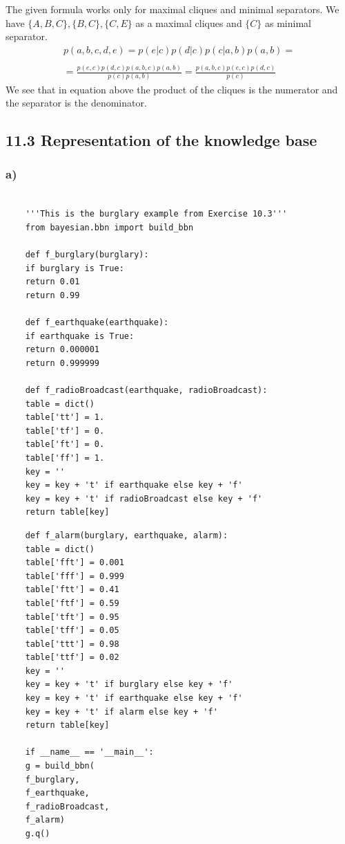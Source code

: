 \documentclass[11pt,a4paper]{article}
\begin{document}
	The given formula works only for maximal cliques and minimal separators. We have $\{A, B, C\}, \{B, C\}, \{C, E\}$ as a maximal cliques and $\{C\}$ as minimal separator.
	\begin{equation}
	\begin{split}
	p(a, b, c, d, e) = p(e|c)p(d|c)p(c|a,b)p(a,b) = \\
	\\
	= \frac{p(e, c)p(d, c)p(a, b, c)p(a, b)}{p(c)p(a, b)} = \frac{p(a, b, c)p(e, c)p(d, c)}{p(c)}
	\end{split}
	\end{equation}
	We see that in equation above the product of the cliques is the numerator and the separator is the denominator.
	
	\subsection*{11.3 Representation of the knowledge base}
	\subsubsection*{a)}
	\begin{verbatim}
	
	'''This is the burglary example from Exercise 10.3'''
	from bayesian.bbn import build_bbn
	
	def f_burglary(burglary):
	if burglary is True:
	return 0.01
	return 0.99
	
	def f_earthquake(earthquake):
	if earthquake is True:
	return 0.000001
	return 0.999999
	
	def f_radioBroadcast(earthquake, radioBroadcast):
	table = dict()
	table['tt'] = 1.
	table['tf'] = 0.
	table['ft'] = 0.
	table['ff'] = 1.
	key = ''
	key = key + 't' if earthquake else key + 'f'
	key = key + 't' if radioBroadcast else key + 'f'
	return table[key]
	\end{verbatim}
	\newpage
	\begin{verbatim}
	def f_alarm(burglary, earthquake, alarm):
	table = dict()
	table['fft'] = 0.001
	table['fff'] = 0.999
	table['ftt'] = 0.41
	table['ftf'] = 0.59
	table['tft'] = 0.95
	table['tff'] = 0.05
	table['ttt'] = 0.98
	table['ttf'] = 0.02
	key = ''
	key = key + 't' if burglary else key + 'f'
	key = key + 't' if earthquake else key + 'f'
	key = key + 't' if alarm else key + 'f'
	return table[key]
	
	if __name__ == '__main__':
	g = build_bbn(
	f_burglary,
	f_earthquake,
	f_radioBroadcast,
	f_alarm)
	g.q()
	\end{verbatim}
\end{document}
